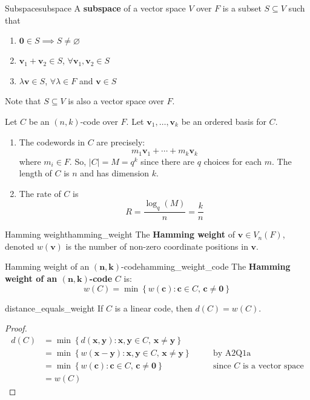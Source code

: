 \begin{Definition}{Subspace}{subspace}
    A \textbf{subspace} of a vector space $ V $ over $ F $ is a subset
    $ S\subseteq V $ such that
    \begin{enumerate}[label=V\arabic*]
        \item $ \bm{0}\in S \implies S\neq \varnothing $
        \item $ \bm{v}_1+\bm{v}_2\in S $, $ \forall \bm{v}_1,\bm{v}_2\in S $
        \item $ \lambda \bm{v}\in S $, $ \forall \lambda\in F $ and $ \bm{v}\in S $
    \end{enumerate}
    Note that $ S\subseteq V $ is also a vector space over $ F $.
\end{Definition}

Let $ C $ be an $ (n,k) $-code over $ F $. Let $ \bm{v}_1,\ldots,\bm{v}_k $ be
an ordered basis for $ C $.
\begin{enumerate}[label=(\arabic*)]
    \item The codewords in $ C $ are precisely:
          \[ m_1\bm{v}_1+\cdots +m_k\bm{v}_k \]
          where $ m_i\in F $. So, $ |C|=M=q^k $ since there are $ q $ choices for each $ m $.
          The length of $ C $ is $ n $ and has dimension $ k $.
    \item The rate of $ C $ is
          \[ R=\frac{\log_q(M)}{n} =\frac{k}{n} \]
\end{enumerate}

\begin{Definition}{Hamming weight}{hamming_weight}
    The \textbf{Hamming weight} of $ \bm{v}\in V_n(F) $, denoted
    $ w(\bm{v}) $ is the number of non-zero coordinate positions in $ \bm{v} $.
\end{Definition}

\begin{Definition}{Hamming weight of an $ \bm{(n,k)} $-code}{hamming_weight_code}
    The \textbf{Hamming weight of an $ \bm{(n,k)} $-code} $ C $ is:
    \[ w(C)=\min \left\{ w(\bm{c}):\bm{c}\in C,\,\bm{c}\neq \bm{0}\right\} \]
\end{Definition}

\begin{Theorem}{}{distance_equals_weight}
    If $ C $ is a linear code, then $ d(C)=w(C) $.
\end{Theorem}

\begin{proof}
    \begin{align*}
        d(C) & =\min \left\{ d(\bm{x},\bm{y}):\bm{x},\bm{y}\in C,\,\bm{x}\neq \bm{y}\right\}                                              \\
             & =\min \left\{ w(\bm{x}-\bm{y}):\bm{x},\bm{y}\in C,\,\bm{x}\neq \bm{y}\right\} & \quad & \text{by A2Q1a}                    \\
             & =\min \left\{ w(\bm{c}):\bm{c}\in C,\,\bm{c}\neq \bm{0}\right\}               &       & \text{since $C$ is a vector space} \\
             & =w(C)
    \end{align*}
\end{proof}

